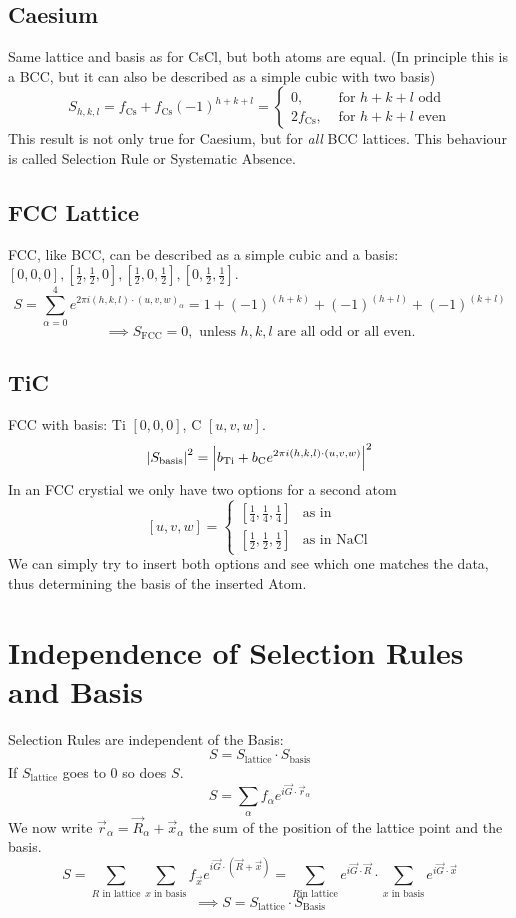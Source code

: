 \documentclass{report}
\begin{document}
\subsection{Caesium}
Same lattice and basis as for CsCl, but both atoms are equal. (In principle this is a BCC, but it can also be described as a simple cubic with two basis) \[
	S_{h,k,l} = f_{\text{Cs}} + f_{\text{Cs}} \left( -1 \right) ^{h+k+l} = \begin{cases}
		0 , & \text{ for } h+k+l \text{ odd}\\
		2 f_{\text{Cs}} , & \text{ for } h+k+l \text{ even}
	\end{cases}
\] This result is not only true for Caesium, but for \emph{all} BCC lattices. This behaviour is called Selection Rule or Systematic Absence. 
\subsection{FCC Lattice}
FCC, like BCC, can be described as a simple cubic and a basis: $[0,0,0], [\frac{1}{2}, \frac{1}{2}, 0], [\frac{1}{2}, 0, \frac{1}{2}], [0, \frac{1}{2}, \frac{1}{2}]$. \[
	S = \sum_{\alpha = 0}^{4} e^{2\pi i (h,k,l) \cdot (u,v,w)_{\alpha}} = 1 + \left( -1 \right) ^{(h+k)} + \left( -1 \right) ^{(h+l)} + \left( -1 \right) ^{(k+l)}
\] \[
\implies S_{\text{FCC}} = 0, \text{ unless } h,k,l \text{ are all odd or all even}
.\]
\subsection{TiC}
FCC with basis: Ti $[0,0,0]$, C $[u,v,w]$. \[
	\abs{S_{\text{basis}}}^2 = \abs{b_{\text{Ti}} + b_{\text{C}} e^{2 \pi i \left( h, k, l \right) \cdot \left( u,v,w \right) }}^2
\] In an FCC crystial we only have two options for a second atom \[
[u,v,w] = \begin{cases}
	[\frac{1}{4}, \frac{1}{4}, \frac{1}{4}] & \text{as in }\\
	[\frac{1}{2}, \frac{1}{2},\frac{1}{2}] & \text{as in NaCl}
\end{cases}
\] We can simply try to insert both options and see which one matches the data, thus determining the basis of the inserted Atom.
\section{Independence of Selection Rules and Basis}
Selection Rules are independent of the Basis: \[
	S = S_{\text{lattice}} \cdot S_{\text{basis}}
	\] If $S_{\text{lattice}}$ goes to $0$ so does $S$. \[
S = \sum_{\alpha} f_{\alpha} e^{i \vec{G} \cdot \vec{r}_{\alpha}}
\] We now write $\vec{r}_{\alpha} = \vec{R}_{\alpha} + \vec{x}_{\alpha}$ the sum of the position of the lattice point and the basis. \[
S = \sum_{R \text{ in lattice}} \sum_{x \text{ in basis}} f_{\vec{x}} e^{i\vec{G} \cdot \left( \vec{R} + \vec{x} \right) } = \sum_{R \text{in lattice}} e^{i \vec{G}\cdot\vec{R}} \cdot \sum_{x \text{ in basis}} e^{i \vec{G}\cdot\vec{x}}
\]   \[
\implies S = S_{\text{lattice}} \cdot S_{\text{Basis}}
\] 
\end{document}

